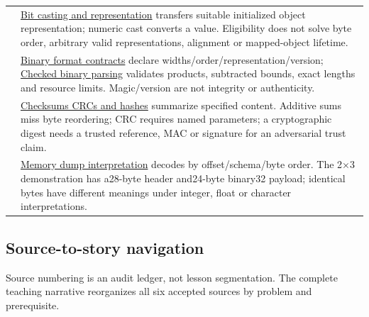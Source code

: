 {\begin{longtable}[]{@{}
  >{\raggedright\arraybackslash}p{}
  >{\raggedright\arraybackslash}p{}@{}}
97 & \hyperref[appendix-34ee45f161c1]{Bit casting and representation} transfers suitable initialized object representation; numeric cast converts a value. Eligibility does not solve byte order, arbitrary valid representations, alignment or mapped-object lifetime. \\
98 & \hyperref[appendix-590bbb2424c1]{Binary format contracts} declare widths/order/representation/version; \hyperref[appendix-652d81568de9]{Checked binary parsing} validates products, subtracted bounds, exact lengths and resource limits. Magic/version are not integrity or authenticity. \\
99 & \hyperref[appendix-ed338677de0a]{Checksums CRCs and hashes} summarize specified content. Additive sums miss byte reordering; CRC requires named parameters; a cryptographic digest needs a trusted reference, MAC or signature for an adversarial trust claim. \\
100 & \hyperref[appendix-230b59c0676b]{Memory dump interpretation} decodes by offset/schema/byte order. The 2×3 demonstration has a28-byte header and24-byte binary32 payload; identical bytes have different meanings under integer, float or character interpretations. \\
\end{longtable}
}

\subsection{Source-to-story navigation}\label{appendix-fd090d982a15-source-to-story-navigation}

Source numbering is an audit ledger, not lesson segmentation. The complete teaching narrative reorganizes all six accepted sources by problem and prerequisite.

